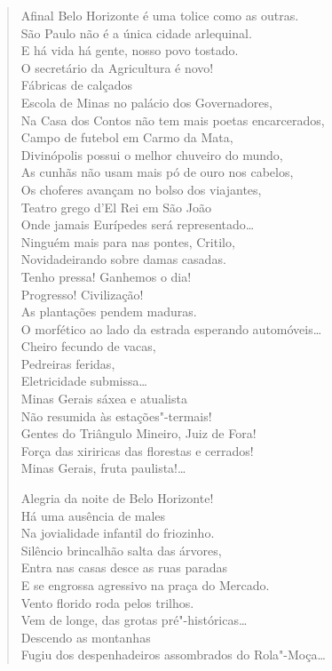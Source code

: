 {\begin{verse}
Afinal Belo Horizonte é uma tolice como as outras.\\
São Paulo não é a única cidade arlequinal.\\
E há vida há gente, nosso povo tostado.\\
O secretário da Agricultura é novo!\\
Fábricas de calçados\\
Escola de Minas no palácio dos Governadores,\\
Na Casa dos Contos não tem mais poetas encarcerados,\\
Campo de futebol em Carmo da Mata,\\
Divinópolis possui o melhor chuveiro do mundo,\\
As cunhãs não usam mais pó de ouro nos cabelos,\\
Os choferes avançam no bolso dos viajantes,\\
Teatro grego d'El Rei em São João\\
Onde jamais Eurípedes será representado\ldots{}\\
Ninguém mais para nas pontes, Critilo,\\
Novidadeirando sobre damas casadas.\\
Tenho pressa! Ganhemos o dia!\\
Progresso! Civilização!\\
As plantações pendem maduras.\\
\quad{}O morfético ao lado da estrada esperando automóveis\ldots{}\\
Cheiro fecundo de vacas,\\
Pedreiras feridas,\\
Eletricidade submissa\ldots{}\\
Minas Gerais sáxea e atualista\\
Não resumida às estações"-termais!\\
Gentes do Triângulo Mineiro, Juiz de Fora!\\
Força das xiriricas das florestas e cerrados!\\
Minas Gerais, fruta paulista!\ldots{}

Alegria da noite de Belo Horizonte!\\
Há uma ausência de males\\
Na jovialidade infantil do friozinho.\\
Silêncio brincalhão salta das árvores,\\
Entra nas casas desce as ruas paradas\\
E se engrossa agressivo na praça do Mercado.\\
Vento florido roda pelos trilhos.\\
Vem de longe, das grotas pré"-históricas\ldots{}\\
Descendo as montanhas\\
Fugiu dos despenhadeiros assombrados do Rola"-Moça\ldots{}


\end{verse}}
